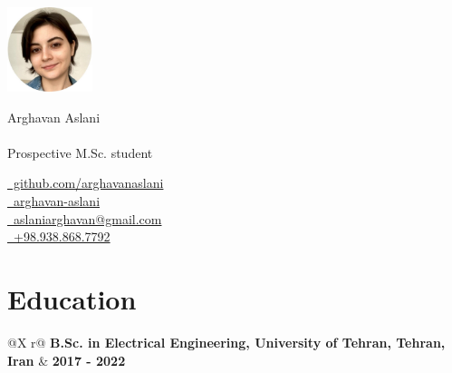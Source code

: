 \documentclass[a4paper,10pt]{article}
\begin{document}
\pagestyle{empty} 


\begin{minipage}[c]{2.5cm}
    \includegraphics[width=2.5cm]{./avatar/avatar6.jpg}
\end{minipage}%
\hspace{1em}
\begin{minipage}[c]{\dimexpr\linewidth-2.5cm-15em\relax}
    \Huge{Arghavan Aslani}\\
    \vspace{0.1cm}\\
    \normalsize{Prospective M.Sc. student}
\end{minipage}%
\begin{minipage}[c]{0.3\linewidth}
    \href{https://github.com/arghavanaslani}{\raisebox{-0.05\height}\faGithub\ github.com/arghavanaslani} \\ 
    \href{https://www.linkedin.com/in/arghavan-aslani/}{\raisebox{-0.05\height}\faLinkedin\ arghavan-aslani} \\ 
    \href{mailto:aslaniarghavan@gmail.com}{\raisebox{-0.05\height}\faEnvelope \ aslaniarghavan@gmail.com} \\ 
    \href{tel:+989388687792}{\raisebox{-0.05\height}\faMobile \ +98.938.868.7792}
\end{minipage}

\section{Education}
\begin{tabularx}{\linewidth}{@{}X r@{}}
    \textbf{B.Sc. in Electrical Engineering, University of Tehran, Tehran, Iran} & \textbf{2017 - 2022} \\
     \\
\end{tabularx}
\end{document}
